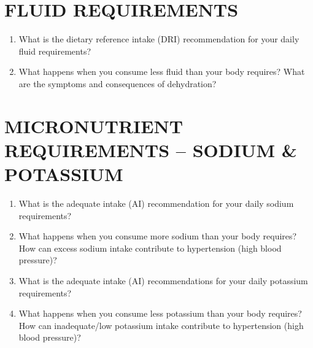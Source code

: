 \documentclass[
	title={Dietary Analysis Assignment - Nutrient Requirements},
	points={30}
]{fdsn201homework}
\begin{document}
\section{FLUID REQUIREMENTS}\label{sec:fluid-requirements}
\begin{enumerate}[start=25]
	\item What is the dietary reference intake (DRI) recommendation for your daily fluid requirements?
	\item What happens when you consume less fluid than your body requires?
	What are the symptoms and consequences of dehydration?
\end{enumerate}

\section{MICRONUTRIENT REQUIREMENTS – SODIUM \& POTASSIUM}\label{sec:micronutrient-requirements--sodium-&-potassium}
\begin{enumerate}[start=27]
	\item What is the adequate intake (AI) recommendation for your daily sodium requirements?
	\item What happens when you consume more sodium than your body requires?
	How can excess sodium intake contribute to hypertension (high blood pressure)?
	\item What is the adequate intake (AI) recommendations for your daily potassium requirements?
	\item What happens when you consume less potassium than your body requires?
	How can inadequate/low potassium intake contribute to hypertension (high blood pressure)?
\end{enumerate}
\end{document}
